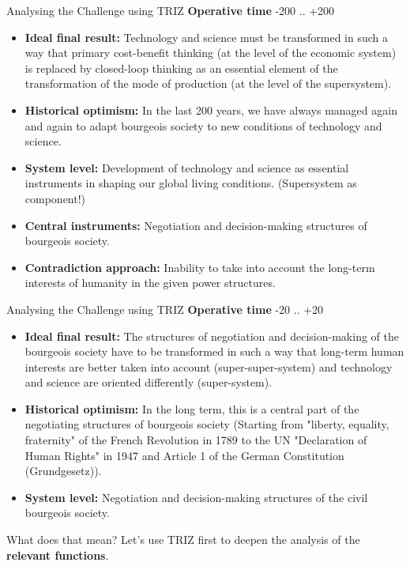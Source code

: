 \documentclass{beamer}
\begin{document}
\begin{frame}{Analysing the Challenge using TRIZ}
  \textbf{Operative time} -200 .. +200\small
  \begin{itemize}
  \item \textbf{Ideal final result:} Technology and science must be
    transformed in such a way that primary cost-benefit thinking (at the level
    of the economic system) is replaced by closed-loop thinking as an
    essential element of the transformation of the mode of production
    (at the level of the supersystem).
  \item \textbf{Historical optimism:} In the last 200 years, we have always
    managed again and again to adapt bourgeois society to new conditions of
    technology and science.
  \item \textbf{System level:} Development of technology and science as
    essential instruments in shaping our global living conditions.
    (Supersystem as component!)
  \item \textbf{Central instruments:} Negotiation and decision-making
    structures of bourgeois society.
  \item \textbf{Contradiction approach:} Inability to take into account the
    long-term interests of humanity in the given power structures.
  \end{itemize}
\end{frame}

\begin{frame}{Analysing the Challenge using TRIZ}
  \textbf{Operative time} -20 .. +20\small
  \begin{itemize}
  \item \textbf{Ideal final result:} The structures of negotiation and
    decision-making of the bourgeois society have to be transformed in such a
    way that long-term human interests are better taken into account
    (super-super-system) and technology and science are oriented differently
    (super-system).
  \item \textbf{Historical optimism:} In the long term, this is a central part
    of the negotiating structures of bourgeois society (Starting from
    "liberty, equality, fraternity" of the French Revolution in 1789 to the UN
    "Declaration of Human Rights" in 1947 and Article 1 of the German
    Constitution (Grundgesetz)).
  \item \textbf{System level:} Negotiation and decision-making structures of
    the civil bourgeois society.
  \end{itemize}

What does that mean?  Let's use TRIZ first to deepen the analysis of the
\textbf{relevant functions}.
\end{frame}
\end{document}
